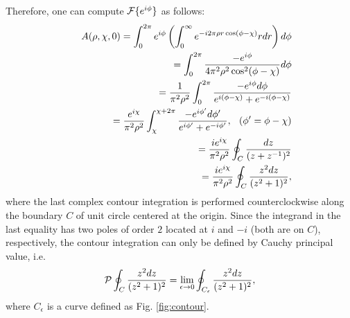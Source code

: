 Therefore, one can compute ${\cal F} \{e^{i\phi}\}$ as follows:
\begin{eqnarray}
	&&A(\rho, \chi, 0) = \int_{0}^{2\pi} e^{i\phi} 
	\left(\int_{0}^{\infty} e^{-i2\pi \rho r \cos(\phi - \chi)} r dr\right) d\phi
	\nonumber\\
	&&\hspace{0.5in}= \int_{0}^{2\pi} \frac{-e^{i\phi}}{4 \pi^2 \rho^2 \cos^2(\phi - \chi)} d\phi
	\nonumber\\
	&&\hspace{0.5in}= \frac{1}{\pi^2 \rho^2} \int_{0}^{2\pi} \frac{-e^{i\phi} d\phi}{e^{i(\phi - \chi)} + e^{-i(\phi - \chi)}}
	\nonumber\\
	&&\hspace{0.5in}= \frac{ e^{i\chi} }{\pi^2 \rho^2} \int_{\chi}^{\chi + 2\pi}
	\frac{-e^{i\phi'} d\phi'}{e^{i\phi'} + e^{-i\phi'}},
	\hspace{0.1in} (\phi' = \phi - \chi)
	\nonumber\\
	&&\hspace{0.5in}= \frac{i e^{i \chi}}{\pi^2 \rho^2} \oint_C \frac{dz}{(z + z^{-1})^2}
	\nonumber\\
	&&\hspace{0.5in}= \frac{i e^{i \chi}}{\pi^2 \rho^2} \oint_C \frac{z^2 dz}{(z^2 + 1)^2},
\end{eqnarray}
where the last complex contour integration is performed counterclockwise along the boundary $C$ of unit circle centered at the origin. Since the integrand in the last equality has two poles of order $2$ located at $i$ and $-i$ (both are on $C$), respectively, the contour integration can only be defined by Cauchy principal value, i.e.
\begin{eqnarray}
	{\cal P} \oint_C \frac{z^2 dz}{(z^2 + 1)^2} = \lim_{\epsilon \rightarrow 0} \oint_{C_{\epsilon}} \frac{z^2 dz}{(z^2 + 1)^2},
	\label{eq:CPV}
\end{eqnarray}
where $C_{\epsilon}$ is a curve defined as Fig. \ref{fig:contour}.

